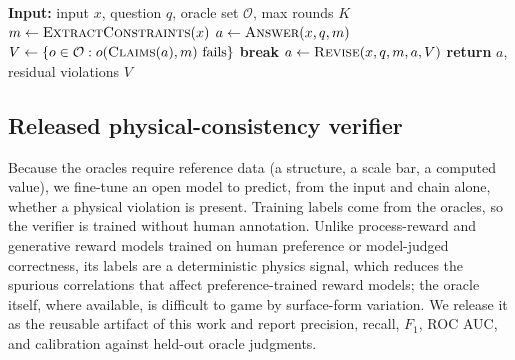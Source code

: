 \documentclass[pdflatex,sn-nature]{sn-jnl}
\begin{document}
\begin{algorithm}[t]
\caption{Constraint-Grounded Self-Verification}
\label{alg:cgsv}
\begin{algorithmic}[1]
\State \textbf{Input:} input $x$, question $q$, oracle set $\mathcal{O}$, max rounds $K$
\State $m \gets \textsc{ExtractConstraints}(x)$
\State $a \gets \textsc{Answer}(x,q,m)$
  \State $V \gets \{o \in \mathcal{O} : o(\textsc{Claims}(a), m)\ \text{fails}\}$
   \State \textbf{break} \EndIf
  \State $a \gets \textsc{Revise}(x, q, m, a, V)$
\EndFor
\State \textbf{return} $a$, residual violations $V$
\end{algorithmic}
\end{algorithm}

\subsection*{Released physical-consistency verifier}
Because the oracles require reference data (a structure, a scale bar, a computed
value), we fine-tune an open model to predict, from the input and chain alone,
whether a physical violation is present. Training labels come from the oracles, so the
verifier is trained without human annotation. Unlike process-reward and generative
reward models trained on human preference or model-judged
correctness,\cite{processbench2025,compassverifier2025} its labels are a deterministic
physics signal, which reduces the spurious correlations that affect preference-trained
reward models; the oracle itself, where available, is difficult to game by surface-form variation. We release it as the reusable artifact of this work and report precision,
recall, $F_1$, ROC AUC, and calibration against held-out oracle judgments.
\end{document}
